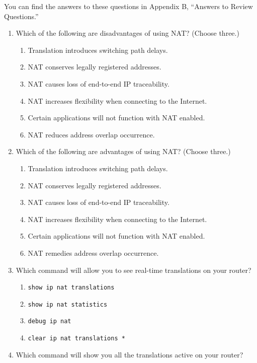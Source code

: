 \documentclass[b5paper,11pt]{memoir}
\begin{document}
You can find the answers to these questions in Appendix B, ``Answers to
Review Questions.''

\begin{enumerate}
\item
  Which of the following are disadvantages of using NAT? (Choose three.)

  \begin{enumerate}
  \tightlist
  \item
    Translation introduces switching path delays.
  \item
    NAT conserves legally registered addresses.
  \item
    NAT causes loss of end-to-end IP traceability.
  \item
    NAT increases flexibility when connecting to the Internet.
  \item
    Certain applications will not function with NAT enabled.
  \item
    NAT reduces address overlap occurrence.
  \end{enumerate}
\item
  Which of the following are advantages of using NAT? (Choose three.)

  \begin{enumerate}
  \tightlist
  \item
    Translation introduces switching path delays.
  \item
    NAT conserves legally registered addresses.
  \item
    NAT causes loss of end-to-end IP traceability.
  \item
    NAT increases flexibility when connecting to the Internet.
  \item
    Certain applications will not function with NAT enabled.
  \item
    NAT remedies address overlap occurrence.
  \end{enumerate}
\item
  Which command will allow you to see real-time translations on your
  router?

  \begin{enumerate}
  \tightlist
  \item
    \texttt{show\ ip\ nat\ translations}
  \item
    \texttt{show\ ip\ nat\ statistics}
  \item
    \texttt{debug\ ip\ nat}
  \item
    \texttt{clear\ ip\ nat\ translations\ *}
  \end{enumerate}
\item
  Which command will show you all the translations active on your
  router?


\end{enumerate}
\end{document}
